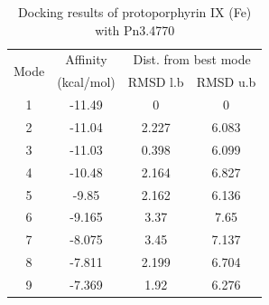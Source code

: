 \documentclass[12pt]{article}
\begin{document}
	
	
	\begin{table}[h!]
		\centering
		\caption{Docking results of protoporphyrin IX (Fe) with Pn3.4770}
		\label{table5k_1}
		\begin{tabular}{cccc}
			\toprule
			\multirow{2}{*}{Mode} & Affinity & \multicolumn{2}{c}{Dist. from best mode}\\
			&  (kcal/mol) & RMSD l.b & RMSD u.b\\
			\midrule
			1 & -11.49   &       0   &       0\\
			2 & -11.04   &   2.227   &   6.083\\
			3 & -11.03   &   0.398   &   6.099\\
			4 & -10.48   &   2.164   &   6.827\\
			5 &  -9.85   &   2.162   &   6.136\\
			6 & -9.165   &    3.37   &    7.65\\
			7 & -8.075   &    3.45   &   7.137\\
			8 & -7.811   &   2.199   &   6.704\\
			9 & -7.369   &    1.92   &   6.276\\
			\bottomrule
			
		\end{tabular}
	\end{table}
	
\end{document}
